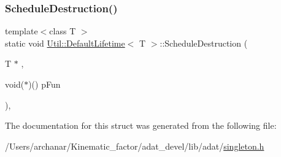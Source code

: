 \subsubsection{\texorpdfstring{ScheduleDestruction()}{ScheduleDestruction()}\hspace{0.1cm}{\footnotesize\ttfamily [2/2]}}
{\footnotesize\ttfamily template$<$class T $>$ \\
static void \mbox{\hyperlink{structUtil_1_1DefaultLifetime}{Util\+::\+Default\+Lifetime}}$<$ T $>$\+::Schedule\+Destruction (\begin{DoxyParamCaption}\item[{T $\ast$}]{,  }\item[{void($\ast$)()}]{p\+Fun }\end{DoxyParamCaption})\hspace{0.3cm}{\ttfamily [inline]}, {\ttfamily [static]}}



The documentation for this struct was generated from the following file\+:\begin{DoxyCompactItemize}
\item 
/\+Users/archanar/\+Kinematic\+\_\+factor/adat\+\_\+devel/lib/adat/\mbox{\hyperlink{lib_2adat_2singleton_8h}{singleton.\+h}}\end{DoxyCompactItemize}
